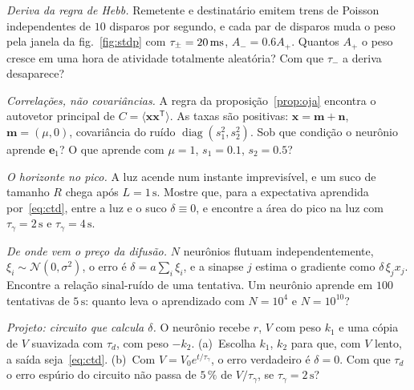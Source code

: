 \begin{exercise}[\lvlA]
\label{ex:06:2}
\emph{Deriva da regra de Hebb.} Remetente e destinatário emitem trens de Poisson independentes de $10$ disparos por segundo, e cada par de disparos muda o peso pela janela da fig.~\ref{fig:stdp} com $\tau_\pm=20\,\text{ms}$, $A_-=0.6A_+$. Quantos $A_+$ o peso cresce em uma hora de atividade totalmente aleatória? Com que $\tau_-$ a deriva desaparece?
\end{exercise}

\begin{exercise}[\lvlB]
\label{ex:06:3}
\emph{Correlações, não covariâncias.} A regra da proposição~\ref{prop:oja} encontra o autovetor principal de $C=\langle\mathbf x\mathbf x^{\mathsf T}\rangle$. As taxas são positivas: $\mathbf x=\mathbf m+\mathbf n$, $\mathbf m=(\mu,0)$, covariância do ruído $\operatorname{diag}(s_1^2,s_2^2)$. Sob que condição o neurônio aprende $\mathbf e_1$? O que aprende com $\mu=1$, $s_1=0.1$, $s_2=0.5$?
\end{exercise}

\begin{exercise}[\lvlA]
\label{ex:06:4}
\emph{O horizonte no pico.} A luz acende num instante imprevisível, e um suco de tamanho $R$ chega após $L=1\,\text{s}$. Mostre que, para a expectativa aprendida por~\eqref{eq:ctd}, entre a luz e o suco $\delta\equiv0$, e encontre a área do pico na luz com $\tau_\gamma=2\,\text{s}$ e $\tau_\gamma=4\,\text{s}$.
\end{exercise}

\begin{exercise}[\lvlB]
\label{ex:06:5}
\emph{De onde vem o preço da difusão.} $N$ neurônios flutuam independentemente, $\xi_i\sim\mathcal N(0,\sigma^2)$, o erro é $\delta=a\sum_i\xi_i$, e a sinapse $j$ estima o gradiente como $\delta\,\xi_jx_j$. Encontre a relação sinal-ruído de uma tentativa. Um neurônio aprende em $100$ tentativas de $5\,\text{s}$: quanto leva o aprendizado com $N=10^4$ e $N=10^{10}$?
\end{exercise}

\begin{exercise}[\lvlB]
\label{ex:06:6}
\emph{Projeto: circuito que calcula $\delta$.} O neurônio  recebe $r$, $V$ com peso $k_1$ e uma cópia de $V$ suavizada com $\tau_d$, com peso $-k_2$. (a)~Escolha $k_1$, $k_2$ para que, com $V$ lento, a saída seja~\eqref{eq:ctd}. (b)~Com $V=V_0e^{t/\tau_\gamma}$, o erro verdadeiro é $\delta=0$. Com que $\tau_d$ o erro espúrio do circuito não passa de $5\,\%$ de $V/\tau_\gamma$, se $\tau_\gamma=2\,\text{s}$?
\end{exercise}

